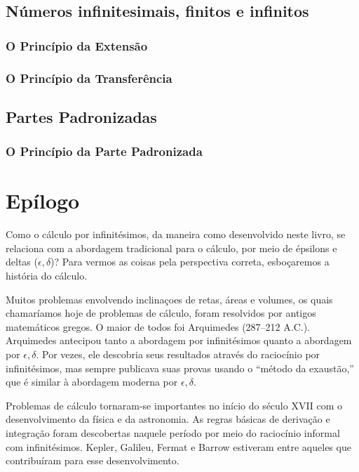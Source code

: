 \documentclass{svmono}
\begin{document}
\section{Números infinitesimais, finitos e infinitos}
\label{sec:infnumbers}

\subsection{O Princípio da Extensão}
\label{sec:extprinciple}

\subsection{O Princípio da Transferência}
\label{sec:transferprinciple}

\section{Partes Padronizadas}
\label{sec:standardparts}

\subsection{O Princípio da Parte Padronizada}
\label{sec:stpartprinciple}

\chapterproblems{\ref{chp:reals}}

\chapter*{Epílogo}

Como o cálculo por infinitésimos, da maneira como desenvolvido neste livro,
se relaciona com a abordagem tradicional para o cálculo, por meio de
épsilons e deltas ($\epsilon,\delta$)?
Para vermos as coisas pela perspectiva correta,
esboçaremos a história do cálculo.

Muitos problemas envolvendo inclinaçoes de retas, áreas e volumes, os quais
chamaríamos hoje de problemas de cálculo, foram resolvidos por antigos
matemáticos gregos. O maior de todos foi Arquimedes (287--212 A.C.).
Arquimedes antecipou tanto a abordagem por infinitésimos quanto a
abordagem por $\epsilon,\delta$. Por vezes, ele descobria seus resultados
através do raciocínio por infinitésimos, mas sempre publicava suas provas
usando o ``método da exaustão,'' que é similar à abordagem moderna por
$\epsilon,\delta$.

Problemas de cálculo tornaram-se importantes no início do século
XVII com o desenvolvimento da física e da astronomia. As regras
básicas de derivação e integração foram descobertas naquele período
por meio do raciocínio informal com infinitésimos. Kepler, Galileu,
Fermat e Barrow estiveram entre aqueles que contribuíram para esse
desenvolvimento.
\end{document}
